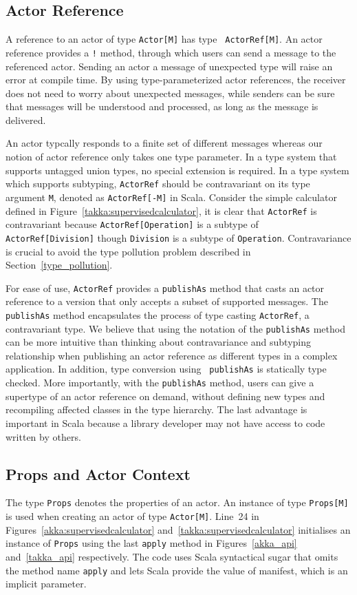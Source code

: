 \subsection{Actor Reference}
\label{actor_ref}
A reference to an actor of type {\tt Actor[M]} has type {\tt
ActorRef[M]}.  An actor reference provides a {\tt !} method, through which users
can send a message to the referenced actor.  Sending an actor a message of 
unexpected type will raise an error at compile time. By using 
type-parameterized actor references, the receiver does not need to worry about 
unexpected messages, while senders can be sure that messages will be understood 
and processed, as long as the message is delivered.

An actor typcally responds to a finite set of different messages 
whereas our notion of actor reference only takes one type parameter.  In a 
type system that supports untagged union types, no special extension is
required.  In a type system which supports subtyping, {\tt ActorRef} should
be contravariant on its type argument {\tt M}, denoted as {\tt ActorRef[-M]} in 
Scala. Consider the simple calculator defined in Figure~\ref{takka:supervisedcalculator}, it is clear that {\tt ActorRef} is 
contravariant because {\tt ActorRef[Operation]} is a subtype of {\tt 
ActorRef[Division]} though {\tt Division} is a subtype of {\tt Operation}. 
Contravariance is crucial to avoid the type pollution problem described in 
Section~\ref{type_pollution}.  

For ease of use, {\tt ActorRef} provides a {\tt publishAs} method that 
casts an actor reference to a version that only accepts a subset of supported 
messages.  The {\tt publishAs} method encapsulates the process of type casting 
{\tt ActorRef}, a contravariant type.  We believe that using the notation of the
{\tt publishAs} method can be more intuitive than thinking about contravariance 
and subtyping relationship when publishing an actor reference as different 
types in a complex application.  In addition, type conversion using {\tt 
publishAs} is statically type checked.  More importantly, with the 
{\tt publishAs} method, users can give a supertype of an actor reference on 
demand, without defining new types and recompiling affected classes in the type 
hierarchy.  The last advantage is important in Scala because a library 
developer may not have access to code written by others.


\subsection{Props and Actor Context}
\label{actor_context}
The type {\tt Props} denotes the properties of an actor.   An instance  of type 
{\tt Props[M]} is used when creating an actor of type {\tt Actor[M]}.  
Line~24 in Figures~\ref{akka:supervisedcalculator} and~\ref{takka:supervisedcalculator}
initialises an instance of {\tt Props} using the last {\tt apply} method
in Figures~\ref{akka_api} and~\ref{takka_api} respectively.  The code uses Scala
syntactical sugar that omits the method name {\tt apply} and lets Scala provide
the value of manifest, which is an implicit parameter.


